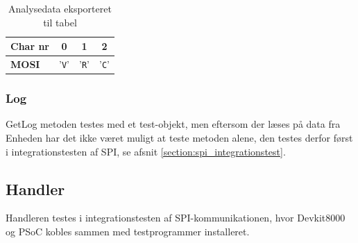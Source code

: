 \begin{table}[H]
	\caption{Analysedata eksporteret til tabel}
	\centering
	\begin{tabular}{|l|c|c|c|}
		\hline 
		\textbf{Char nr} & \textbf{0} & \textbf{1} & \textbf{2}\\ 		
		\hline 
		\textbf{MOSI} & '\verb+V+' & '\verb+R+'  & '\verb+C+'\\ 
		\hline 
	\end{tabular} 
	\label{table:mt_verify}
\end{table}


\subsubsection*{Log}
GetLog metoden testes med et test-objekt, men eftersom der læses på data fra Enheden har det ikke været muligt at teste metoden alene, den testes derfor først i integrationstesten af SPI, se afsnit \ref{section:spi_integrationstest}.

\subsection{Handler}

 Handleren testes i integrationstesten af SPI-kommunikationen, hvor Devkit8000 og PSoC kobles sammen med testprogrammer installeret.